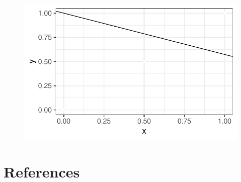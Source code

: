 \documentclass[
  letterpaper,
  DIV=11,
  numbers=noendperiod]{scrreprt}
\begin{document}
\begin{figure}[H]

{\centering \includegraphics{yieldloss-regression-models_files/figure-pdf/unnamed-chunk-5-1.pdf}

}

\end{figure}


\hypertarget{references}{%
\chapter*{References}\label{references}}

\end{document}
